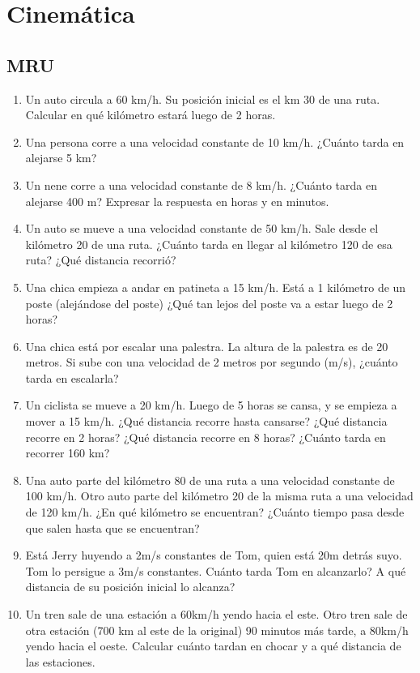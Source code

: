 \section{Cinemática}

\subsection{MRU}

\begin{enumerate}
\item Un auto circula a 60 km/h. Su posición inicial es el km 30 de una ruta. Calcular en qué kilómetro estará luego de 2 horas.

\item Una persona corre a una velocidad constante de 10 km/h. ¿Cuánto tarda en alejarse 5 km? %

\item Un nene corre a una velocidad constante de 8 km/h. ¿Cuánto tarda en alejarse 400 m? Expresar la respuesta en horas y en minutos. %

\item Un auto se mueve a una velocidad constante de 50 km/h. Sale desde el kilómetro 20 de una ruta. ¿Cuánto tarda en llegar al kilómetro 120 de esa ruta? ¿Qué distancia recorrió? %

\item Una chica empieza a andar en patineta a 15 km/h. Está a 1 kilómetro de un poste (alejándose del poste) ¿Qué tan lejos del poste va a estar luego de 2 horas?

\item Una chica está por escalar una palestra. La altura de la palestra es de 20 metros. Si sube con una velocidad de 2 metros por segundo (m/s), ¿cuánto tarda en escalarla?

\item Un ciclista se mueve a 20 km/h. Luego de 5 horas se cansa, y se empieza a mover a 15 km/h. ¿Qué distancia recorre hasta cansarse? ¿Qué distancia recorre en 2 horas? ¿Qué distancia recorre en 8 horas? ¿Cuánto tarda en recorrer 160 km? %

\item Una auto parte del kilómetro 80 de una ruta a una velocidad constante de 100 km/h. Otro auto parte del kilómetro 20 de la misma ruta a una velocidad de 120 km/h. ¿En qué kilómetro se encuentran? ¿Cuánto tiempo pasa desde que salen hasta que se encuentran? %

\item Está Jerry huyendo a 2m/s constantes de Tom, quien está 20m detrás suyo. Tom lo persigue a 3m/s constantes. Cuánto tarda Tom en alcanzarlo? A qué distancia de su posición inicial lo alcanza?

\item Un tren sale de una estación a 60km/h yendo hacia el este. Otro tren sale de otra estación (700 km al este de la original) 90 minutos más tarde, a 80km/h yendo hacia el oeste. Calcular cuánto tardan en chocar y a qué distancia de las estaciones.

\end{enumerate}


